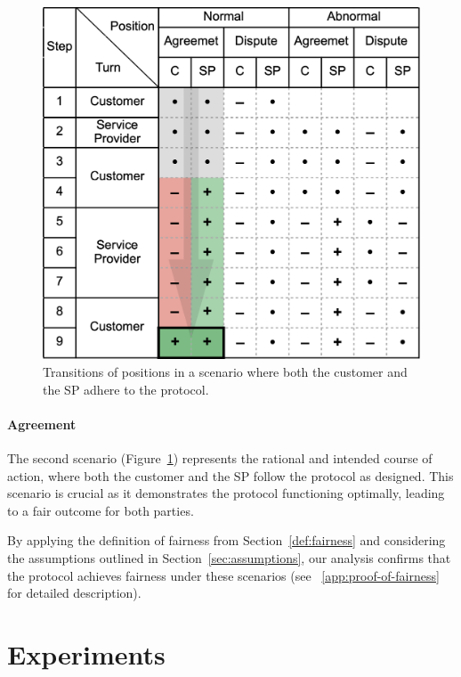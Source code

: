 \documentclass[pdftex,twocolumn,epjc3]{svjour3}
\begin{document}
\begin{figure}[h!]
\includegraphics[width=\linewidth]{rational.png}
\centering
\caption{Transitions of positions in a scenario where both the customer and the SP adhere to the protocol.}
\label{fig:rational}
\end{figure}

\paragraph{Agreement}
The second scenario (Figure~\ref{fig:rational}) represents the rational and intended course of action, where both the customer and the SP follow the protocol as designed. This scenario is crucial as it demonstrates the protocol functioning optimally, leading to a fair outcome for both parties.

By applying the definition of fairness from Section~\ref{def:fairness} and considering the assumptions outlined in Section~\ref{sec:assumptions}, our analysis confirms that the protocol achieves fairness under these scenarios (see ~\ref{app:proof-of-fairness} for detailed description).

\section{Experiments}\label{sec:experiments}
\end{document}
